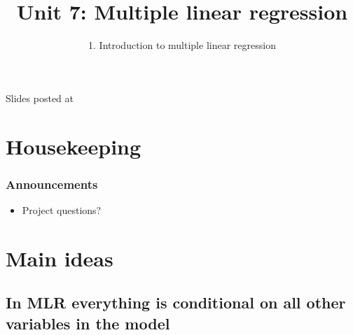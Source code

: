 \documentclass[slidestop,compress,mathserif,12pt,t,professionalfonts,xcolor=table]{beamer}
\title{Unit 7: Multiple linear regression}
\subtitle{1. Introduction to multiple linear regression}
\author{\CourseName}
\date{}
\institute{\InstituteName}
\begin{document}



\begin{frame}[plain]

\titlepage

\vfill

{\scriptsize {} \hfill Slides posted at  \webURL{\CourseSite}}

\addtocounter{framenumber}{-1} 

\end{frame}


\section{Housekeeping}


\begin{frame}
\frametitle{Announcements}

\begin{itemize}

\item Project questions?

\end{itemize}

\end{frame}


\section{Main ideas}


\subsection{In MLR everything is conditional on all other variables in the model}
\label{mi1}

\end{document}

